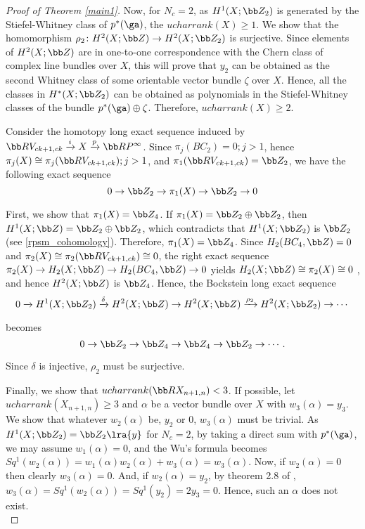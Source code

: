 \begin{proof}[Proof of Theorem \ref{main1}]
    Now, for $N_c=2$, as $H^1(X;\bb Z_2)$ is generated by the Stiefel-Whitney class of $p^*(\ga)$, the $ucharrank(X)\geq 1$. We show that the homomorphism $\rho_2\colon H^2(X;\bb Z)\to H^2(X;\bb Z_2)$ is surjective. Since elements of $H^2(X; \bb Z)$ are in one-to-one correspondence with the Chern class of complex line bundles over $X$, this will prove that $y_2$ can be obtained as the second Whitney class of some orientable vector bundle $\zeta$ over $X$. Hence, all the classes in $H^*(X; \bb Z_2)$ can be obtained as polynomials in the Stiefel-Whitney classes of the bundle $p^*(\ga)\oplus \zeta$. Therefore, $ucharrank(X)\geq 2$.
    
    Consider the homotopy long exact sequence induced by $\bb RV_{ck+1,ck}\xrightarrow{i} X\xrightarrow{p} \bb RP^{\infty}$. Since $\pi_j(BC_2)=0; j>1$, hence $\pi_j(X)\cong \pi_j(\bb RV_{ck+1, ck}); j>1$, and $\pi_1(\bb RV_{ck+1, ck})=\bb Z_2$, we have the following exact sequence
                \[0\to \bb Z_2\to \pi_1(X)\to \bb Z_2\to 0\]
                        
    First, we show that $\pi_1(X)=\bb Z_4 $. If $\pi_1(X)=\bb Z_2\oplus \bb Z_2$, then $H^1(X; \bb Z)=\bb Z_2\oplus \bb Z_2$, which contradicts that $H^1(X; \bb Z_2)$ is $\bb Z_2$(see \ref{rpsm_cohomology}). Therefore, $\pi_1(X) = \bb Z_4 $. Since $H_2(BC_4, \bb Z)=0$ and $\pi_2(X)\cong \pi_2(\bb RV_{ck+1, ck})\cong 0$, the right exact sequence $\pi_2(X)\to H_2(X; \bb Z)\to H_2(BC_4, \bb Z)\to 0$ yields $H_2(X; \bb Z)\cong \pi_2(X)\cong 0$ , and hence $H^2(X; \bb Z)$ is $\bb Z_4 $. Hence, the Bockstein long exact sequence
\[ 0\xrightarrow{} H^1(X; \bb Z_2)\xrightarrow{\delta} H^2(X; \bb Z)\to H^2(X; \bb Z)\xrightarrow{\rho_2} H^2(X; \bb Z_2)\rightarrow\cdots\]

becomes
            \[0\to\bb Z_2\to \bb Z_4 \to \bb Z_4 \to\bb Z_2\to\cdots.\]

Since $\delta$ is injective, $\rho_2$ must be surjective.

Finally, we show that $ucharrank(\bb RX_{n+1, n})< 3$. If possible, let $ucharrank(X_{n+1, n})\geq 3$ and $\alpha$ be a vector bundle over $X$ with $w_3(\alpha) = y_3$. We show that whatever $w_2(\alpha)$ be, $y_2$ or $0$, $w_3(\alpha)$ must be trivial. As $H^1(X; \bb Z_2)=\bb Z_2\lra{y}$ for $N_c=2$, by taking a direct sum with $p^*(\ga)$, we may assume $w_1(\alpha)=0$, and the Wu's formula becomes $Sq^1(w_2(\alpha))=w_1(\alpha)w_2(\alpha)+ w_3(\alpha)=w_3(\alpha)$. Now, if $w_2(\alpha)=0$ then clearly $w_3(\alpha)=0$. And, if $w_2(\alpha)=y_2$, by theorem 2.8 of \cite{GH68}, $w_3(\alpha)=Sq^1(w_2(\alpha))=Sq^1(y_2)=2y_3=0$. Hence, such an $\alpha$ does not exist.\\



\end{proof}
